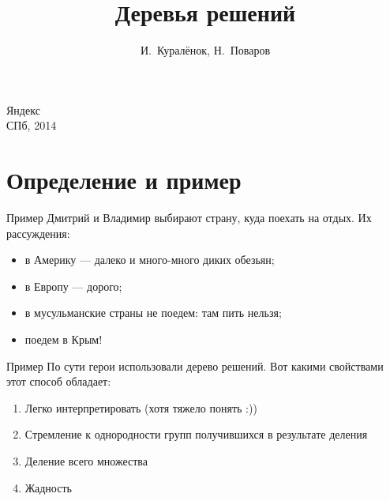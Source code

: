 \documentclass[14pt, fleqn, xcolor={dvipsnames, table}]{beamer}
\title{Деревья решений\\\small{}}
\author[]{\small{%
И.~Куралёнок,
Н.~Поваров}}
\date{}
\begin{document}
\begin{frame}
\maketitle
\small
\begin{center}
\vspace{-60pt}
\normalsize {\color{red}Я}ндекс \\
\vspace{80pt}
\footnotesize СПб, 2014
\end{center}
\end{frame}

\section{Определение и пример}
\begin{frame}{Пример}
Дмитрий и Владимир выбирают страну, куда поехать на отдых. Их рассуждения:
\begin{itemize}
  \item в Америку --- далеко и много-много диких обезьян;
  \item в Европу --- дорого;
  \item в мусульманские страны не поедем: там пить нельзя;
  \item поедем в Крым!
\end{itemize}
\end{frame}

\begin{frame}{Пример}
По сути герои использовали дерево решений. Вот какими свойствами этот способ обладает:
\begin{enumerate}
  \item Легко интерпретировать (хотя тяжело понять :))
  \item Стремление к однородности групп получившихся в результате деления
  \item Деление всего множества
  \item Жадность
\end{enumerate}
\end{frame}
\end{document}
